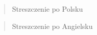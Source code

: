 \begin{abstract}
Streszczenie po Polsku
\end{abstract}

{
\begin{abstract}
Streszczenie po Angielsku
\end{abstract}
}
